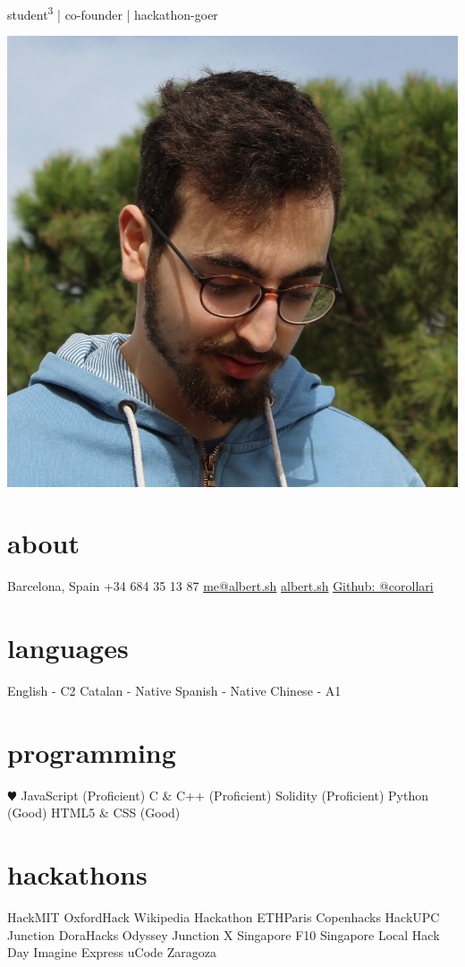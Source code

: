 \documentclass[]{friggeri-cv}
\begin{document}
       {student\textsuperscript{3} | co-founder | hackathon-goer}

\begin{aside}
  \includegraphics[width=\textwidth]{me.jpg}
  \section{about}
    Barcelona, Spain
    +34 684 35 13 87
    \href{mailto:me@albert.sh}{me@albert.sh}
    \href{https://albert.sh}{albert.sh}
    \href{https://github.com/corollari}{Github: @corollari}
  \section{languages}
    English - C2
    Catalan - Native
    Spanish - Native
    Chinese - A1
  \section{programming}
    {\color{red} $\varheartsuit$} JavaScript (Proficient)
    C \& C++ (Proficient)
    Solidity (Proficient)
    Python (Good)
    HTML5 \& CSS (Good)
  \section{hackathons}
HackMIT
OxfordHack
Wikipedia Hackathon
ETHParis
Copenhacks
HackUPC
Junction
DoraHacks
Odyssey
Junction X Singapore
F10 Singapore
Local Hack Day
Imagine Express
uCode Zaragoza
\end{aside}
%
\end{document}
